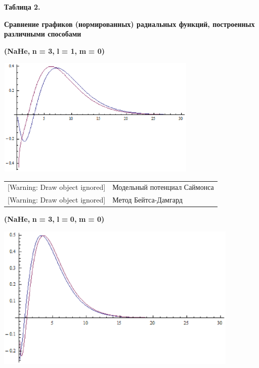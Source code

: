 {\centering
\textbf{Таблица 2.}
\par}




\textbf{Сравнение
графиков (нормированных) радиальных функций, построенных различными
способами}

\textbf{(}\textbf{NaHe}\textbf{, }\textbf{n}\textbf{ = 3,
}\textbf{l}\textbf{ = 1, }\textbf{m}\textbf{ = 0)}

\includegraphics[width=9.537cm,height=5.655cm]{chervinskaya-14.eps}



\begin{tabular}{m{3.741cm}m{12.927cm}}
[Warning: Draw object ignored] &
Модельный потенциал
Саймонса\\
{}[Warning: Draw object ignored] &
Метод
Бейтса-Дамгард\\
\end{tabular}




\textbf{(}\textbf{NaHe}\textbf{, }\textbf{n}\textbf{ = 3,
}\textbf{l}\textbf{ = }\textbf{0}\textbf{,
}\textbf{m}\textbf{ = 0)}

\includegraphics[width=11.592cm,height=6.904cm]{chervinskaya-15.eps}



